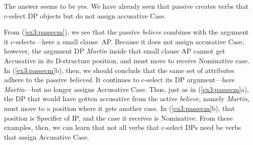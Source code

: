 The answer seems to be yes. We have already seen that passive creates verbs that c-select DP objects but do not assign accusative Case. 
\begin{exe}
	\ex \label{ex3:passecm}
	\begin{xlist}
	\end{xlist}
\end{exe}
From (\ref{ex3:passecm}), we see that the passive \emph{believe} combines with the argument it c-selects---here a small clause~AP. Because it does not assign accusative Case, however, the argument DP \emph{Martin} inside that small clause AP cannot get Accusative in its D-structure position, and must move to receive Nominative case. In (\ref{ex3:passecm}b), then, we should conclude that the same set of attributes adhere to the passive \emph{believed}. It continues to c-select its DP argument---here \emph{Martin}---but no longer assigns Accusative Case. Thus, just as in (\ref{ex3:passecm}a), the DP that would have gotten accusative from the active \emph{believe}, namely \emph{Martin}, must move to a position where it gets another case. In (\ref{ex3:passecm}b), that position is Specifier of IP, and the case it receives is Nominative. From these examples, then, we can learn that not all verbs that c-select DPs need be verbs that assign Accusative Case. 

